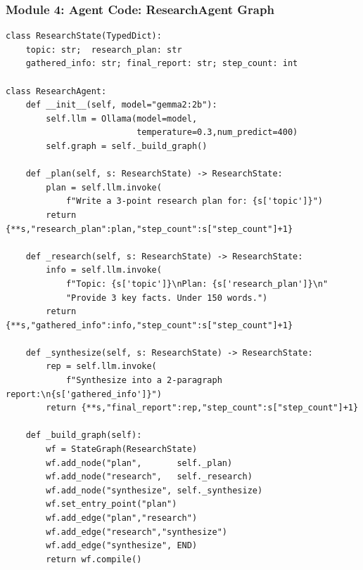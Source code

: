 \begin{frame}[fragile]\frametitle{Module 4: Agent Code: ResearchAgent Graph}
\begin{lstlisting}
class ResearchState(TypedDict):
    topic: str;  research_plan: str
    gathered_info: str; final_report: str; step_count: int

class ResearchAgent:
    def __init__(self, model="gemma2:2b"):
        self.llm = Ollama(model=model,
                          temperature=0.3,num_predict=400)
        self.graph = self._build_graph()

    def _plan(self, s: ResearchState) -> ResearchState:
        plan = self.llm.invoke(
            f"Write a 3-point research plan for: {s['topic']}")
        return {**s,"research_plan":plan,"step_count":s["step_count"]+1}

    def _research(self, s: ResearchState) -> ResearchState:
        info = self.llm.invoke(
            f"Topic: {s['topic']}\nPlan: {s['research_plan']}\n"
            "Provide 3 key facts. Under 150 words.")
        return {**s,"gathered_info":info,"step_count":s["step_count"]+1}

    def _synthesize(self, s: ResearchState) -> ResearchState:
        rep = self.llm.invoke(
            f"Synthesize into a 2-paragraph report:\n{s['gathered_info']}")
        return {**s,"final_report":rep,"step_count":s["step_count"]+1}

    def _build_graph(self):
        wf = StateGraph(ResearchState)
        wf.add_node("plan",       self._plan)
        wf.add_node("research",   self._research)
        wf.add_node("synthesize", self._synthesize)
        wf.set_entry_point("plan")
        wf.add_edge("plan","research")
        wf.add_edge("research","synthesize")
        wf.add_edge("synthesize", END)
        return wf.compile()
\end{lstlisting}
\end{frame}

